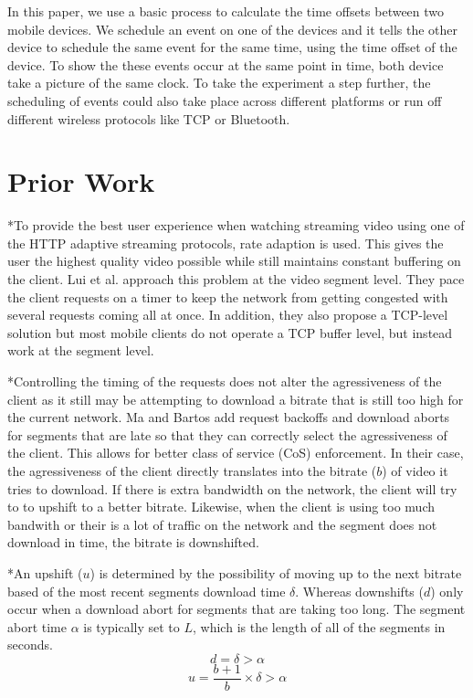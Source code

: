 \documentclass[10pt]{IEEEtran} %
\begin{document}
In this paper, we use a basic process to calculate the time offsets between two
mobile devices. We schedule an event on one of the devices and it tells the
other device to schedule the same event for the same time, using the time offset
of the device. To show the these events occur at the same point in time, both
device take a picture of the same clock. To take the experiment a step further,
the scheduling of events could also take place across different platforms or run
off different wireless protocols like TCP or Bluetooth.

\section{Prior Work}

*To provide the best user experience when watching streaming video using one of
the HTTP adaptive streaming protocols, rate adaption is used. This gives the
user the highest quality video possible while still maintains constant buffering
on the client. Lui et al. \cite{rate} approach this problem at the video segment level. 
They pace the client requests on a timer to keep the network from getting
congested with several requests coming all at once. In addition, they also 
propose a TCP-level solution but most mobile clients do not operate a TCP buffer
level, but instead work at the segment level.

*Controlling the timing of the requests does not alter the agressiveness of the
client as it still may be attempting to download a bitrate that is still too
high for the current network. Ma and Bartos \cite{cos} add request backoffs and download 
aborts for segments that are late so that they can correctly select the 
agressiveness of the client. This allows for better class of service (CoS) 
enforcement. In their case, the agressiveness of the client directly translates 
into the bitrate ($b$) of video it tries to download. If there is extra 
bandwidth on the network, the client will try to to upshift to a better bitrate. 
Likewise, when the client is using too much bandwith or their is a lot of 
traffic on the network and the segment does not download in time, the bitrate is 
downshifted.

*An upshift ($u$) is determined by the possibility of moving up to the next bitrate
based of the most recent segments download time $\delta$. Whereas downshifts 
($d$) only occur when a download abort for segments that are taking too long. 
The segment abort time $\alpha$ is typically set to $L$, which is the length of 
all of the segments in seconds.
\begin{equation}
    d = \delta > \alpha
\end {equation}
\begin{equation}
    u = \frac{b+1}{b} \times \delta > \alpha
\end {equation}
\end{document}
